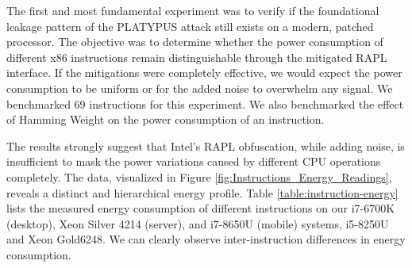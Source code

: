 The first and most fundamental experiment was to verify if the foundational leakage pattern of the PLATYPUS attack still exists on a modern, patched processor. The objective was to determine whether the power consumption of different x86 instructions remain distinguishable through the mitigated RAPL interface. If the mitigations were completely effective, we would expect the power consumption to be uniform or for the added noise to overwhelm any signal. We benchmarked 69 instructions for this experiment. We also benchmarked the effect of Hamming Weight on the power consumption of an instruction.

The results strongly suggest that Intel’s RAPL obfuscation, while adding noise,
is insufficient to mask the power variations caused by different CPU operations completely. The data, visualized in Figure \ref{fig:Instructions_Energy_Readings}, reveals a distinct and hierarchical energy profile.
Table \ref{table:instruction-energy} lists the measured energy consumption of different
instructions on our i7-6700K (desktop), Xeon Silver 4214 (server), and i7-8650U (mobile) systems, i5-8250U and Xeon Gold6248. We can clearly
observe inter-instruction differences in energy consumption.